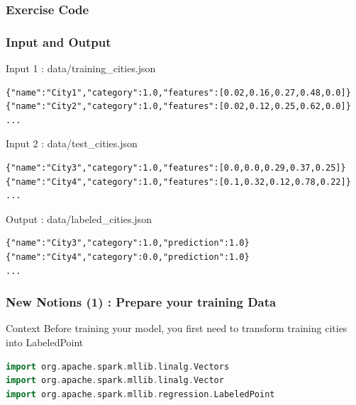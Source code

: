 \documentclass[slidetop,9pt,utf8]{beamer}
\begin{document}
\begin{CJK}{UTF8}{gbsn}
\begin{frame}
  \frametitle{Exercise Code}

  

\end{frame}

\begin{frame}[fragile]

  \frametitle{Input and Output}
  
  \begin{block}{Input 1 : data/training\_cities.json}
    \begin{verbatim}
{"name":"City1","category":1.0,"features":[0.02,0.16,0.27,0.48,0.0]}
{"name":"City2","category":1.0,"features":[0.02,0.12,0.25,0.62,0.0]}
...
    \end{verbatim}
  \end{block}

  \begin{block}{Input 2 : data/test\_cities.json}
    \begin{verbatim}
{"name":"City3","category":1.0,"features":[0.0,0.0,0.29,0.37,0.25]}
{"name":"City4","category":1.0,"features":[0.1,0.32,0.12,0.78,0.22]}
...
    \end{verbatim}
  \end{block}

  \begin{block}{Output : data/labeled\_cities.json}
    \begin{verbatim}
{"name":"City3","category":1.0,"prediction":1.0}
{"name":"City4","category":0.0,"prediction":1.0}
...
    \end{verbatim}
  \end{block}

\end{frame}

\begin{frame}[fragile]
  \frametitle{New Notions (1) : Prepare your training Data}

  \begin{block}{Context}
    Before training your model, you first need to transform training cities into LabeledPoint
  \end{block}

  \begin{lstlisting}[label=TransformDataToLinearRegression, caption=Transform row into LabeledPoint, language=scala, style=code]
import org.apache.spark.mllib.linalg.Vectors
import org.apache.spark.mllib.linalg.Vector
import org.apache.spark.mllib.regression.LabeledPoint


\end{lstlisting}
\end{frame}
\end{CJK}
\end{document}

